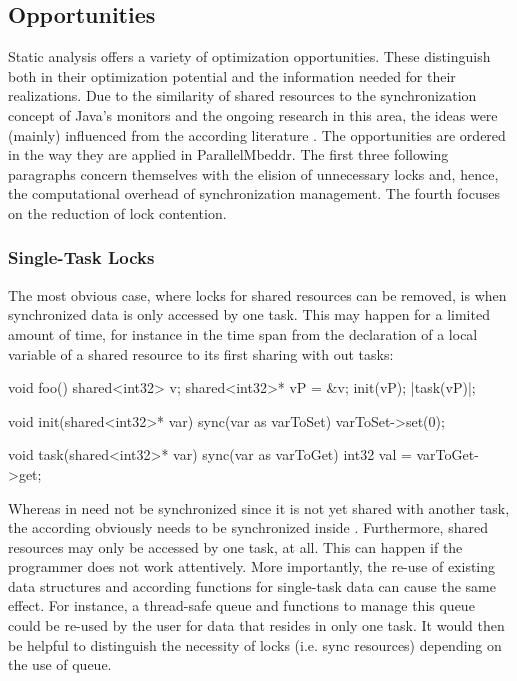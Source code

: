 \subsection{Opportunities}
Static analysis offers a variety of optimization opportunities. These distinguish both in their optimization potential and the information needed for their realizations. Due to the similarity of shared resources to the synchronization concept of Java's monitors and the ongoing research in this area, the ideas were (mainly) influenced from the according literature \cite{StaticAnalysesForJava}\cite{JavaTheoryAndPractice}\cite{DoJava6Threading}. The opportunities are ordered in the way they are applied in ParallelMbeddr. The first three following paragraphs concern themselves with the elision of unnecessary locks and, hence, the computational overhead of synchronization management. The fourth focuses on the reduction of lock contention.

\subsubsection{Single-Task Locks}
The most obvious case, where locks for shared resources can be removed, is when synchronized data is only accessed by one task. This may happen for a limited amount of time, for instance in the time span from the declaration of a local variable of a shared resource to its first sharing with out tasks:
\begin{ccode}
void foo() {
  shared<int32> v;
  shared<int32>* vP = &v;
  init(vP);
  |task(vP)|;
}

void init(shared<int32>* var) {
  sync(var as varToSet) {
    varToSet->set(0);
  }
}

void task(shared<int32>* var) {
  sync(var as varToGet) {
    int32 val = varToGet->get;
  }
}
\end{ccode}
Whereas  in  need not be synchronized since it is not yet shared with another task, the according  obviously needs to be synchronized inside .
Furthermore, shared resources may only be accessed by one task, at all. This can happen if the programmer does not work attentively. More importantly, the re-use of existing data structures and according functions for single-task data can cause the same effect. For instance, a thread-safe queue and functions to manage this queue could be re-used by the user for data that resides in only one task. It would then be helpful to distinguish the necessity of locks (i.e. sync resources) depending on the use of queue.

